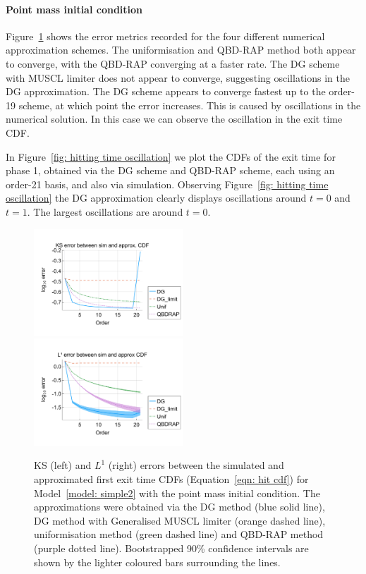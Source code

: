 \paragraph{Point mass initial condition}
Figure~\ref{fig: hitting time pm} shows the error metrics recorded for the four different numerical approximation schemes. The uniformisation and QBD-RAP method both appear to converge, with the QBD-RAP converging at a faster rate. The DG scheme with MUSCL limiter does not appear to converge, suggesting oscillations in the DG approximation. The DG scheme appears to converge fastest up to the order-19 scheme, at which point the error increases. This is caused by oscillations in the numerical solution. In this case we can observe the oscillation in the exit time CDF. 

In Figure~\ref{fig: hitting time oscillation} we plot the CDFs of the exit time for phase 1, obtained via the DG scheme and QBD-RAP scheme, each using an order-21 basis, and also via simulation. Observing Figure~\ref{fig: hitting time oscillation} the DG approximation clearly displays oscillations around \(t=0\) and \(t=1\). The largest oscillations are around \(t=0\). 
\begin{figure}
	\centering
	\includegraphics[width=0.5\textwidth,trim={0.75cm 0.8cm 0.25cm 1.25cm},clip]{chapter6/figs/hitting_times_model/hitting_times/point_mass/ks_error_formatted.pdf}%
	\includegraphics[width=0.5\textwidth,trim={0.75cm 0.8cm 0.25cm 1.25cm},clip]{chapter6/figs/hitting_times_model/hitting_times/point_mass/l1_cdf_error_formatted.pdf}
	\caption{KS (left) and \(L^1\) (right) errors between the simulated and approximated first exit time CDFs (Equation~\ref{eqn: hit cdf}) for Model~\ref{model: simple2} with the point mass initial condition. The approximations were obtained via the DG method (blue solid line), DG method with Generalised MUSCL limiter (orange dashed line), uniformisation method (green dashed line) and QBD-RAP method (purple dotted line). Bootstrapped 90\% confidence intervals are shown by the lighter coloured bars surrounding the lines.} 
	\label{fig: hitting time pm} 
\end{figure}
